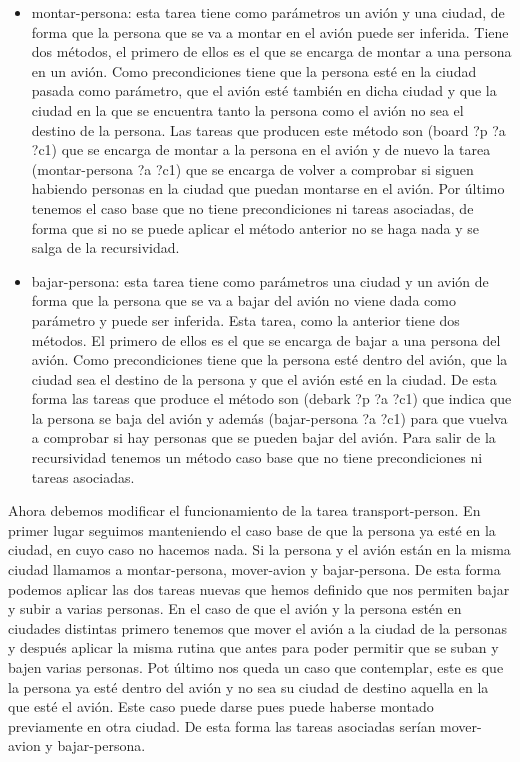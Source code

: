 \documentclass[12pt,a4paper]{article}
\begin{document}
\begin{itemize}
	\item montar-persona: esta tarea tiene como parámetros un avión y una ciudad, de forma que la persona que se va a montar en el avión puede ser inferida. Tiene dos métodos, el primero de ellos es el que se encarga de montar a una persona en un avión. Como precondiciones tiene que la persona esté en la ciudad pasada como parámetro, que el avión esté también en dicha ciudad y que la ciudad en la que se encuentra tanto la persona como el avión no sea el destino de la persona. Las tareas que producen este método son (board ?p ?a ?c1) que se encarga de montar a la persona en el avión y de nuevo la tarea (montar-persona ?a ?c1) que se encarga de volver a comprobar si siguen habiendo personas en la ciudad que puedan montarse en el avión. Por último tenemos el caso base que no tiene precondiciones ni tareas asociadas, de forma que si no se puede aplicar el método anterior no se haga nada y se salga de la recursividad.
	\item bajar-persona: esta tarea tiene como parámetros una ciudad y un avión de forma que la persona que se va a bajar del avión no viene dada como parámetro y puede ser inferida. Esta tarea, como la anterior tiene dos métodos. El primero de ellos es el que se encarga de bajar a una persona del avión. Como precondiciones tiene que la persona esté dentro del avión, que la ciudad sea el destino de la persona y que el avión esté en la ciudad. De esta forma las tareas que produce el método son (debark ?p ?a ?c1) que indica que la persona se baja del avión y además (bajar-persona ?a ?c1) para que vuelva a comprobar si hay personas que se pueden bajar del avión. Para salir de la recursividad tenemos un método caso base que no tiene precondiciones ni tareas asociadas.
\end{itemize}

Ahora debemos modificar el funcionamiento de la tarea transport-person. En primer lugar seguimos manteniendo el caso base de que la persona ya esté en la ciudad, en cuyo caso no hacemos nada. Si la persona y el avión están en la misma ciudad llamamos a montar-persona, mover-avion y bajar-persona. De esta forma podemos aplicar las dos tareas nuevas que hemos definido que nos permiten bajar y subir a varias personas. En el caso de que el avión y la persona estén en ciudades distintas primero tenemos que mover el avión a la ciudad de la personas y después aplicar la misma rutina que antes para poder permitir que se suban y bajen varias personas. Pot último nos queda un caso que contemplar, este es que la persona ya esté dentro del avión y no sea su ciudad de destino aquella en la que esté el avión. Este caso puede darse pues puede haberse montado previamente en otra ciudad. De esta forma las tareas asociadas serían mover-avion y bajar-persona.
\end{document}

